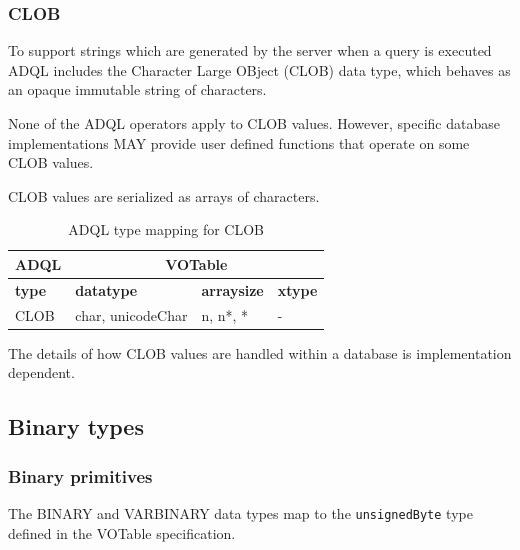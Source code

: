 \documentclass[11pt,a4paper]{ivoa}
\newcommand{\VOTspec}{VOTable specification\xspace}
\begin{document}
\subsubsection{CLOB}
\label{sec:types.character.clob}

To support strings which are generated by the server when a query is executed
ADQL includes the Character Large OBject (CLOB) data type,
which behaves as an opaque immutable string of characters.

None of the ADQL operators apply to CLOB values.
However, specific database implementations MAY provide user
defined functions that operate on some CLOB values.

CLOB values are serialized as arrays of characters.

\begin{table}[thm]\footnotesize
    \begin{tabular}
        {|p{}|p{}|p{}|p{}|}
        \hline

        \hline
        \multicolumn{1}{|c|}{\textbf{ADQL}} &
        \multicolumn{3}{|c|}{\textbf{VOTable}}
        \tabularnewline
        
        \hline
        \textbf{type} &
        \textbf{datatype} &
        \textbf{arraysize} &
        \textbf{xtype}
        \tabularnewline

        \hline
        CLOB &
        char, unicodeChar &
        n, n*, * &
        -
        \tabularnewline

        \hline
    \end{tabular}
    \caption{ADQL type mapping for CLOB}
    \label{table:types.character.clob}
\end{table}

The details of how CLOB values are handled within a
database is implementation dependent.

\subsection{Binary types}
\label{sec:types.binary}

\subsubsection{Binary primitives}
\label{sec:types.binary.primitive}

The BINARY and VARBINARY data types map to the \verb:unsignedByte: type defined
in the \VOTspec.
\end{document}
